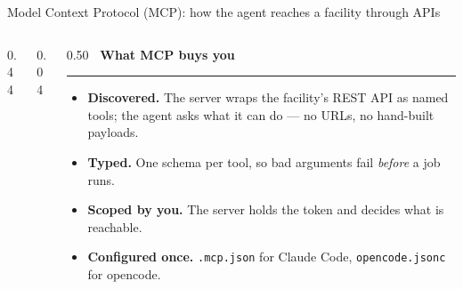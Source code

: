 \documentclass[aspectratio=169,11pt]{beamer}
\newcommand{\sechead}[2]{{\small\color{#1}\bfseries #2}\par\vspace{1.5pt}%
  {\color{#1!45}\rule{\linewidth}{0.6pt}}\par\vspace{4pt}}
\begin{document}
\begin{frame}{Model Context Protocol (MCP): how the agent reaches a facility through APIs}
\begin{columns}[c, totalwidth=\textwidth]
\begin{column}{0.44\textwidth}
    \end{column}
    \begin{column}{0.04\textwidth}\end{column}
    \begin{column}{0.50\textwidth}
      \sechead{labnavy}{\faQuestionCircle\ What MCP buys you}
      \scriptsize
      \begin{itemize}\setlength\itemsep{2.5pt}
        \item[\faSearch] \textbf{Discovered.} The server wraps the facility's
          REST API as named tools; the agent asks what it can do --- no URLs,
          no hand-built payloads.
        \item[\faCheckCircle] \textbf{Typed.} One schema per tool, so bad
          arguments fail \emph{before} a job runs.
        \item[\faUserShield] \textbf{Scoped by you.} The server holds the
          token and decides what is reachable.
        \item[\faWrench] \textbf{Configured once.} \texttt{.mcp.json} for
          Claude Code, \texttt{opencode.jsonc} for opencode.
      \end{itemize}
    \end{column}
  \end{columns}
\end{frame}
\end{document}
